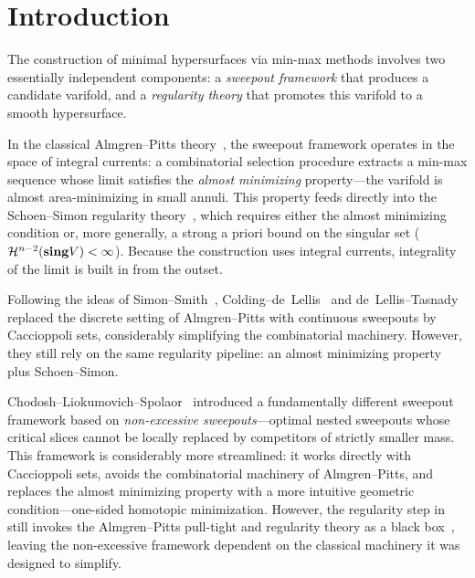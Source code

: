 
\section{Introduction}

The construction of minimal hypersurfaces via min-max methods involves two essentially independent components: a \emph{sweepout framework} that produces a candidate varifold, and a \emph{regularity theory} that promotes this varifold to a smooth hypersurface.

In the classical Almgren--Pitts theory~\cite{Alm65, Pit81}, the sweepout framework operates in the space of integral currents: a combinatorial selection procedure extracts a min-max sequence whose limit satisfies the \emph{almost minimizing} property---the varifold is almost area-minimizing in small annuli. This property feeds directly into the Schoen--Simon regularity theory~\cite{SS81}, which requires either the almost minimizing condition or, more generally, a strong a priori bound on the singular set ($\mathcal{H}^{n-2}(\mathbf{sing} V) < \infty$). Because the construction uses integral currents, integrality of the limit is built in from the outset.

Following the ideas of Simon--Smith~\cite{Smi83}, Colding--de~Lellis~\cite{CL03} and de~Lellis--Tasnady~\cite{DLT13} replaced the discrete setting of Almgren--Pitts with continuous sweepouts by Caccioppoli sets, considerably simplifying the combinatorial machinery. However, they still rely on the same regularity pipeline: an almost minimizing property plus Schoen--Simon.

Chodosh--Liokumovich--Spolaor~\cite{CLS22} introduced a fundamentally different sweepout framework based on \emph{non-excessive sweepouts}---optimal nested sweepouts whose critical slices cannot be locally replaced by competitors of strictly smaller mass. This framework is considerably more streamlined: it works directly with Caccioppoli sets, avoids the combinatorial machinery of Almgren--Pitts, and replaces the almost minimizing property with a more intuitive geometric condition---one-sided homotopic minimization. However, the regularity step in~\cite{CLS22} still invokes the Almgren--Pitts pull-tight and regularity theory as a black box~\cite[Section~3]{CLS22}, leaving the non-excessive framework dependent on the classical machinery it was designed to simplify.

